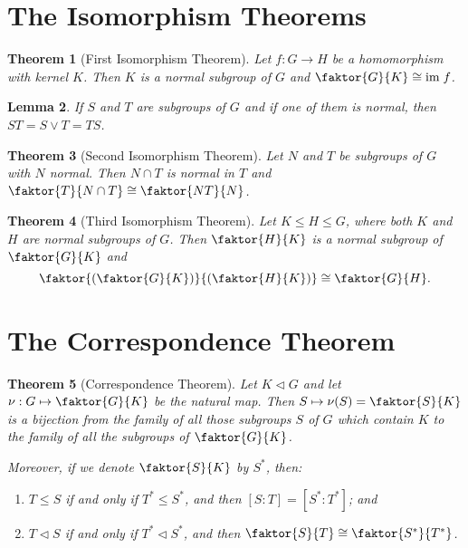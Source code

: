 \documentclass[12pt]{report}
\newtheorem{theorem}{Theorem}[chapter]
\newtheorem{lemma}[theorem]{Lemma}
\theoremstyle{definition}
\begin{document}
\section{The Isomorphism Theorems}

\begin{theorem}[First Isomorphism Theorem]
	Let $f:G\to H$ be a homomorphism with kernel $K$. Then $K$ is a normal subgroup of $G$ and $\faktor{G}{K}\cong \mathrm{im}\;f$.
\end{theorem}

\begin{lemma}
	If $S$ and $T$ are subgroups of $G$ and if one of them is normal, then $ST=S\vee T=TS$.
\end{lemma}

\begin{theorem}[Second Isomorphism Theorem]
	Let $N$ and $T$ be subgroups of $G$ with $N$ normal. Then $N\cap T$ is normal in $T$ and $\faktor{T}{N\cap T}\cong\faktor{NT}{N}$.
\end{theorem}

\begin{theorem}[Third Isomorphism Theorem]
	Let $K\leq H\leq G$, where both $K$ and $H$ are normal subgroups of $G$. Then $\faktor{H}{K}$ is a normal subgroup of $\faktor{G}{K}$ and
	\[ \faktor{\left(\faktor{G}{K}\right)}{\left(\faktor{H}{K}\right)}\cong\faktor{G}{H}. \]
\end{theorem}



\section{The Correspondence Theorem}

\begin{theorem}[Correspondence Theorem]
	Let $K\vartriangleleft G$ and let $\nu:G\mapsto\faktor{G}{K}$ be the natural map.
	Then $S\mapsto\nu(S)=\faktor{S}{K}$ is a bijection from the family of all those subgroups $S$ of $G$ which contain $K$
	to the family of all the subgroups of $\faktor{G}{K}$.
	\par
	Moreover, if we denote $\faktor{S}{K}$ by $S^\ast$, then:
	\begin{enumerate}
		\item $T\leq S$ if and only if $T^\ast\leq S^\ast$, and then $[S:T]=[S^\ast:T^\ast]$; and
		\item $T\vartriangleleft S$ if and only if $T^\ast\vartriangleleft S^\ast$, and then $\faktor{S}{T}\cong\faktor{S^\ast}{T^\ast}$.
	\end{enumerate}
\end{theorem}
\end{document}
